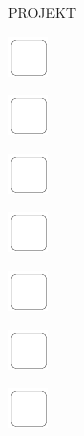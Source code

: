 \documentclass[11pt,titlepage]{article}
\begin{document}
\small %
\hfill PROJEKT

\vspace{6mm}

\noindent
\includegraphics[]{checkbox-6mm.pdf}

\vspace{12mm}

\noindent
\includegraphics[]{checkbox-6mm.pdf}

\vspace{12mm}

\noindent
\includegraphics[]{checkbox-6mm.pdf}

\vspace{12mm}

\noindent
\includegraphics[]{checkbox-6mm.pdf}

\vspace{12mm}

\noindent
\includegraphics[]{checkbox-6mm.pdf}

\vspace{12mm}

\noindent
\includegraphics[]{checkbox-6mm.pdf}

\vspace{12mm}

\noindent
\includegraphics[]{checkbox-6mm.pdf}

\vspace{12mm}
\end{document}
